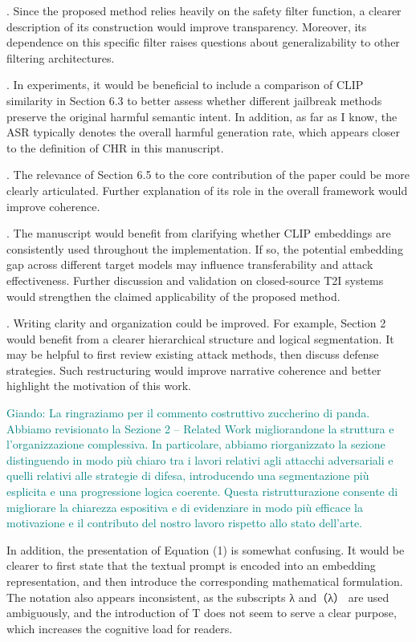 \documentclass{ar2rc}
\newcommand{\giando}[1]{\textcolor{teal}{Giando: #1}}
\begin{document}
    . Since the proposed method relies heavily on the safety filter function, a clearer description of its construction would improve transparency. Moreover, its dependence on this specific filter raises questions about generalizability to other filtering architectures.

    . In experiments, it would be beneficial to include a comparison of CLIP similarity in Section 6.3 to better assess whether different jailbreak methods preserve the original harmful semantic intent. In addition, as far as I know, the ASR typically denotes the overall harmful generation rate, which appears closer to the definition of CHR in this manuscript.

    . The relevance of Section 6.5 to the core contribution of the paper could be more clearly articulated. Further explanation of its role in the overall framework would improve coherence.

    . The manuscript would benefit from clarifying whether CLIP embeddings are consistently used throughout the implementation. If so, the potential embedding gap across different target models may influence transferability and attack effectiveness. Further discussion and validation on closed-source T2I systems would strengthen the claimed applicability of the proposed method.

    . Writing clarity and organization could be improved. For example, Section 2 would benefit from a clearer hierarchical structure and logical segmentation. It may be helpful to first review existing attack methods, then discuss defense strategies. Such restructuring would improve narrative coherence and better highlight the motivation of this work. 

    \AC \giando{La ringraziamo per il commento costruttivo zuccherino di panda. Abbiamo revisionato la Sezione 2 – Related Work migliorandone la struttura e l’organizzazione complessiva. In particolare, abbiamo riorganizzato la sezione distinguendo in modo più chiaro tra i lavori relativi agli attacchi adversariali e quelli relativi alle strategie di difesa, introducendo una segmentazione più esplicita e una progressione logica coerente. Questa ristrutturazione consente di migliorare la chiarezza espositiva e di evidenziare in modo più efficace la motivazione e il contributo del nostro lavoro rispetto allo stato dell’arte.}
        
    \RC In addition, the presentation of Equation (1) is somewhat confusing. It would be clearer to first state that the textual prompt is encoded into an embedding representation, and then introduce the corresponding mathematical formulation. The notation also appears inconsistent, as the subscripts λ and（λ） are used ambiguously, and the introduction of T does not seem to serve a clear purpose, which increases the cognitive load for readers. 
\end{document}
